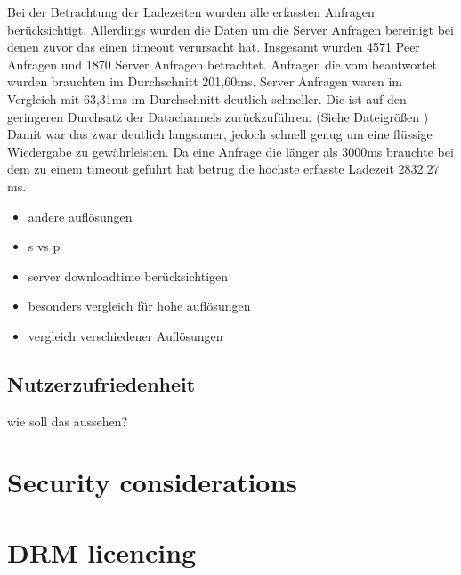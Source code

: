 Bei der Betrachtung der Ladezeiten wurden alle erfassten Anfragen berücksichtigt. Allerdings wurden die Daten um die Server Anfragen bereinigt bei denen zuvor das \pTp \cdn einen timeout verursacht hat. Insgesamt wurden 4571 Peer Anfragen und 1870 Server Anfragen betrachtet. 
Anfragen die vom \pTp \cdn beantwortet wurden brauchten im Durchschnitt 201,60ms. Server Anfragen waren im Vergleich mit 63,31ms im Durchschnitt deutlich schneller. Die ist auf den geringeren Durchsatz der \webrtc Datachannels zurückzuführen. (Siehe Dateigrößen ) Damit war das \pTp \cdn zwar deutlich langsamer, jedoch schnell genug um eine flüssige Wiedergabe zu gewährleisten. Da eine Anfrage die länger als 3000ms brauchte bei dem \pTp \cdn zu einem timeout geführt hat betrug die höchste erfasste Ladezeit 2832,27 ms.    
\begin{itemize}
	\item andere auflösungen
	\item s vs p
	\item server downloadtime berücksichtigen
	\item besonders vergleich für hohe auflösungen
	\item vergleich verschiedener Auflösungen
\end{itemize}
\subsection{Nutzerzufriedenheit}
wie soll das aussehen?

\section{Security considerations}
\section{DRM licencing}
